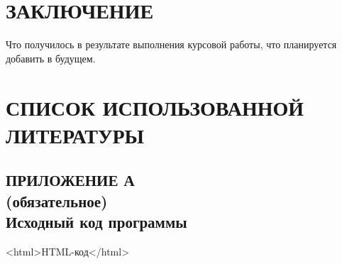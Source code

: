 \documentclass[14pt,a4paper]{extreport}
\begin{document}
	\section*{\center\normalsize ЗАКЛЮЧЕНИЕ \endcenter}
	\hspace{4ex}Что получилось в результате выполнения курсовой работы, что планируется добавить в будущем.
	\newpage
	\section*{\center\normalsize СПИСОК ИСПОЛЬЗОВАННОЙ ЛИТЕРАТУРЫ \endcenter}
	\begin{landscape}
	\newpage
	\section*{\center\normalsize ПРИЛОЖЕНИЕ А\\(обязательное)\\Исходный код программы \endcenter}
	<html>HTML-код</html>
	\end{landscape}
	
	
\end{document}
